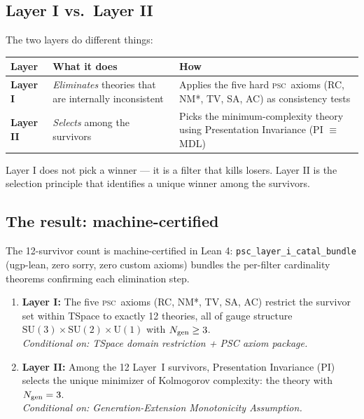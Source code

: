 \documentclass[11pt,a4paper]{article}
\newcommand{\PSC}{\textsc{psc}}
\newcommand{\lean}[1]{\texttt{#1}}
\begin{document}
\subsection{Layer I vs.\ Layer II}

The two layers do different things:

\begin{center}
\begin{tabular}{@{}p{2.5cm}p{4.5cm}p{5cm}@{}}
\toprule
\textbf{Layer} & \textbf{What it does} & \textbf{How} \\
\midrule
\textbf{Layer I}
  & \emph{Eliminates} theories that are internally inconsistent
  & Applies the five hard \PSC\ axioms (RC, NM*, TV, SA, AC) as consistency tests \\[8pt]
\textbf{Layer II}
  & \emph{Selects} among the survivors
  & Picks the minimum-complexity theory using Presentation Invariance (PI $\equiv$ MDL) \\
\bottomrule
\end{tabular}
\end{center}

\medskip
Layer I does not pick a winner — it is a filter that kills losers.  Layer II is
the selection principle that identifies a unique winner among the survivors.

\subsection{The result: machine-certified}

The 12-survivor count is machine-certified in Lean 4:
\lean{psc\_layer\_i\_catal\_bundle} (ugp-lean, zero sorry, zero custom axioms)
bundles the per-filter cardinality theorems confirming each elimination step.

\begin{tcolorbox}[colback=boxorange,colframe=orange!60!black,
  title=Two-Layer PSC Theorem (from P48~\cite{SpivackGTECompleteFramework} §3.3)]
\begin{enumerate}[leftmargin=1.5em,itemsep=4pt]
\item \textbf{Layer I:} The five \PSC\ axioms (RC, NM*, TV, SA, AC) restrict the
  survivor set within TSpace to exactly 12 theories, all of gauge structure
  $\mathrm{SU}(3){\times}\mathrm{SU}(2){\times}\mathrm{U}(1)$ with
  $N_{\rm gen} \geq 3$.\\
  \textit{Conditional on: TSpace domain restriction + PSC axiom package.}

\item \textbf{Layer II:} Among the 12 Layer~I survivors, Presentation Invariance (PI)
  selects the unique minimizer of Kolmogorov complexity:
  the theory with $N_{\rm gen} = 3$.\\
  \textit{Conditional on: Generation-Extension Monotonicity Assumption.}
\end{enumerate}
\end{tcolorbox}
\end{document}
